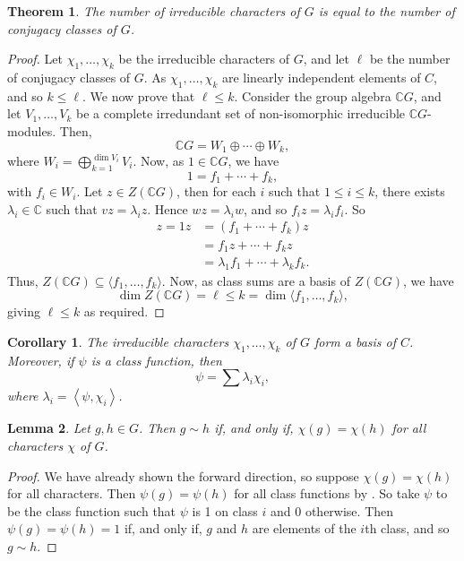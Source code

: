 \documentclass[11pt, notitlepage]{article}
\numberwithin{equation}{section}
\theoremstyle{plain}
\newtheorem{theorem}{Theorem}[section]
\newtheorem{corollary}{Corollary}[theorem]
\newtheorem{lemma}[theorem]{Lemma}
\theoremstyle{definition}
\newcommand{\C}{\mathbb{C}}
\newcommand{\CG}{{\mathbb{C}G}}
\newcommand{\inner}[2]{\left\langle #1,#2 \right\rangle}
\begin{document}
\begin{theorem}
The number of irreducible characters of $G$ is equal to the number of conjugacy classes of $G$.
\end{theorem}

\begin{proof}
Let $\chi_1,\dots,\chi_k$ be the irreducible characters of $G$, and let $\ell$ be the number of conjugacy classes of $G$. As $\chi_1,\dots,\chi_k$ are linearly independent elements of $C$, and so $k \le \ell$. We now prove that $\ell \le k$. Consider the group algebra $\CG$, and let $V_1,\dots,V_k$ be a complete irredundant set of non-isomorphic irreducible $\CG$-modules. Then,
\[
    \CG = W_1 \oplus \cdots \oplus W_k,
\]
where $W_i = \bigoplus_{k=1}^{\dim V_i} V_i$. Now, as $1 \in \CG$, we have
\[
    1 = f_1 + \cdots + f_k,
\]
with $f_i \in W_i$. Let $z \in Z(\CG)$, then for each $i$ such that $1 \le i \le k$, there exists $\lambda_i \in \C$ such that $vz = \lambda_i z$. Hence $wz = \lambda_iw$, and so $f_iz = \lambda_if_i$. So
\begin{align*}
    z = 1z &= (f_1 + \cdots + f_k)z\\
    &= f_1z + \cdots + f_kz\\
    &= \lambda_1 f_1 + \cdots + \lambda_k f_k.
\end{align*}
Thus, $Z(\CG) \subseteq \langle f_1,\dots,f_k \rangle$. Now, as class sums are a basis of $Z(\CG)$, we have
\[
    \dim Z(\CG) = \ell \le k = \dim \langle f_1,\dots,f_k \rangle,
\]
giving $\ell \le k$ as required.
\end{proof}

\begin{corollary}
The irreducible characters $\chi_1,\dots,\chi_k$ of $G$ form a basis of $C$. Moreover, if $\psi$ is a class function, then
\[
    \psi = \sum \lambda_i \chi_i,
\]
where $\lambda_i = \inner{\psi}{\chi_i}$.
\end{corollary}

\begin{lemma}
Let $g, h \in G$. Then $g \sim h$ if, and only if, $\chi(g) = \chi(h)$ for all characters $\chi$ of $G$.
\end{lemma}

\begin{proof}
We have already shown the forward direction, so suppose $\chi(g) = \chi(h)$ for all characters. Then $\psi(g) = \psi(h)$ for all class functions by . So take $\psi$ to be the class function such that $\psi$ is 1 on class $i$ and 0 otherwise. Then $\psi(g) = \psi(h) = 1$ if, and only if, $g$ and $h$ are elements of the $i$th class, and so $g \sim h$.
\end{proof}
\end{document}
